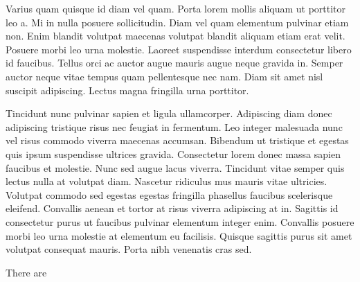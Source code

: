 

Varius quam quisque id diam vel quam. Porta lorem mollis aliquam ut porttitor leo a. Mi in nulla posuere sollicitudin. Diam vel quam elementum pulvinar etiam non. Enim blandit volutpat maecenas volutpat blandit aliquam etiam erat velit. Posuere morbi leo urna molestie. Laoreet suspendisse interdum consectetur libero id faucibus. Tellus orci ac auctor augue mauris augue neque gravida in. Semper auctor neque vitae tempus quam pellentesque nec nam. Diam sit amet nisl suscipit adipiscing. Lectus magna fringilla urna porttitor.

Tincidunt nunc pulvinar sapien et ligula ullamcorper. Adipiscing diam donec adipiscing tristique risus nec feugiat in fermentum. Leo integer malesuada nunc vel risus commodo viverra maecenas accumsan. Bibendum ut tristique et egestas quis ipsum suspendisse ultrices gravida. Consectetur lorem donec massa sapien faucibus et molestie. Nunc sed augue lacus viverra. Tincidunt vitae semper quis lectus nulla at volutpat diam. Nascetur ridiculus mus mauris vitae ultricies. Volutpat commodo sed egestas egestas fringilla phasellus faucibus scelerisque eleifend. Convallis aenean et tortor at risus viverra adipiscing at in. Sagittis id consectetur purus ut faucibus pulvinar elementum integer enim. Convallis posuere morbi leo urna molestie at elementum eu facilisis. Quisque sagittis purus sit amet volutpat consequat mauris. Porta nibh venenatis cras sed.

There are \cite{Tartarini2017PE}


